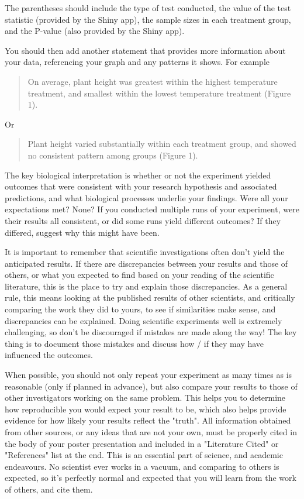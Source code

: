 \documentclass[
]{book}
\begin{document}
The parentheses should include the type of test conducted, the value of the test statistic (provided by the Shiny app), the sample sizes in each treatment group, and the P-value (also provided by the Shiny app).

You should then add another statement that provides more information about your data, referencing your graph and any patterns it shows. For example

\begin{quote}
On average, plant height was greatest within the highest temperature treatment, and smallest within the lowest temperature treatment (Figure 1).
\end{quote}

Or

\begin{quote}
Plant height varied substantially within each treatment group, and showed no consistent pattern among groups (Figure 1).
\end{quote}

The key biological interpretation is whether or not the experiment yielded outcomes that were consistent with your research hypothesis and associated predictions, and what biological processes underlie your findings. Were all your expectations met? None? If you conducted multiple runs of your experiment, were their results all consistent, or did some runs yield different outcomes? If they differed, suggest why this might have been.

It is important to remember that scientific investigations often don't yield the anticipated results. If there are discrepancies between your results and those of others, or what you expected to find based on your reading of the scientific literature, this is the place to try and explain those discrepancies. As a general rule, this means looking at the published results of other scientists, and critically comparing the work they did to yours, to see if similarities make sense, and discrepancies can be explained. Doing scientific experiments well is extremely challenging, so don't be discouraged if mistakes are made along the way! The key thing is to document those mistakes and discuss how / if they may have influenced the outcomes.

When possible, you should not only repeat your experiment as many times as is reasonable (only if planned in advance), but also compare your results to those of other investigators working on the same problem. This helps you to determine how reproducible you would expect your result to be, which also helps provide evidence for how likely your results reflect the "truth". All information obtained from other sources, or any ideas that are not your own, must be properly cited in the body of your poster presentation and included in a "Literature Cited" or "References" list at the end. This is an essential part of science, and academic endeavours. No scientist ever works in a vacuum, and comparing to others is expected, so it's perfectly normal and expected that you will learn from the work of others, and cite them.
\end{document}
